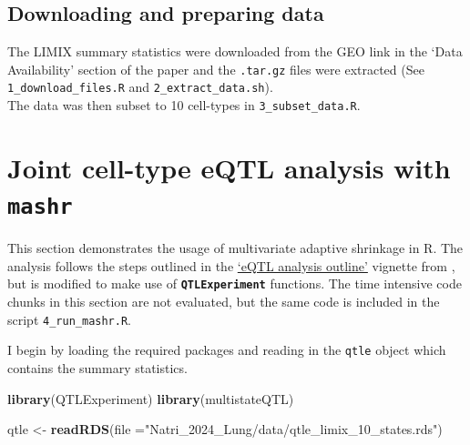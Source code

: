 \documentclass[
]{article}
\newenvironment{Shaded}{\begin{snugshade}}{\end{snugshade}}
\newcommand{\AttributeTok}[1]{\textcolor[rgb]{0.13,0.29,0.53}{#1}}
\newcommand{\FunctionTok}[1]{\textcolor[rgb]{0.13,0.29,0.53}{\textbf{#1}}}
\newcommand{\NormalTok}[1]{#1}
\newcommand{\OtherTok}[1]{\textcolor[rgb]{0.56,0.35,0.01}{#1}}
\newcommand{\StringTok}[1]{\textcolor[rgb]{0.31,0.60,0.02}{#1}}
\begin{document}
\normalsize

\hypertarget{downloading-and-preparing-data}{%
\subsection{Downloading and preparing
data}\label{downloading-and-preparing-data}}

The LIMIX summary statistics were downloaded from the GEO link in the
`Data Availability' section of the \textcite{Natri_2024_lung} paper and
the \texttt{.tar.gz} files were extracted (See
\texttt{1\_download\_files.R} and \texttt{2\_extract\_data.sh}).\\
The data was then subset to 10 cell-types in \texttt{3\_subset\_data.R}.

\hypertarget{joint-cell-type-eqtl-analysis-with}{%
\section{\texorpdfstring{Joint cell-type eQTL analysis with
\texttt{mashr}}{Joint cell-type eQTL analysis with }}\label{joint-cell-type-eqtl-analysis-with}}

This section demonstrates the usage of multivariate adaptive shrinkage
\autocite{Urbut_2019_mashr} in R. The analysis follows the steps
outlined in the
\href{https://stephenslab.github.io/mashr/articles/eQTL_outline.html}{`eQTL analysis outline'}
vignette from \textcite{Stephens_2023_eQTL}, but is modified to make use
of \textbf{\texttt{QTLExperiment}} functions. The time intensive code
chunks in this section are not evaluated, but the same code is included
in the script \texttt{4\_run\_mashr.R}.

I begin by loading the required packages and reading in the
\texttt{qtle} object which contains the summary statistics.

\footnotesize

\begin{Shaded}
\begin{Highlighting}[]
\FunctionTok{library}\NormalTok{(QTLExperiment)}
\FunctionTok{library}\NormalTok{(multistateQTL)}

\NormalTok{qtle }\OtherTok{\textless{}{-}} \FunctionTok{readRDS}\NormalTok{(}\AttributeTok{file =}\StringTok{"Natri\_2024\_Lung/data/qtle\_limix\_10\_states.rds"}\NormalTok{)}
\end{Highlighting}
\end{Shaded}

\normalsize
\end{document}
